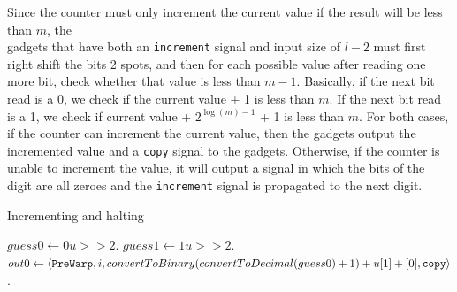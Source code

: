 \begin{itemize}
    Since the counter must only increment the current value if the result will be less than $m$,
    the \\{\cread} gadgets that have both an {\tt increment} signal and input size of $l - 2$ must
    first right shift the bits 2 spots, and then for each possible value after reading one more bit,
    check whether that value is less than $m - 1$. %
    Basically, if the next bit read is a 0, we check if the current value + 1 is less than $m$.
    If the next bit read is a 1, we check if current value + $2^{\log (m) - 1}$ + 1 is less than $m$.
    For both cases, if the counter can increment the current value, then the {\cread} gadgets output the incremented value and a {\tt copy} signal to the {\prewarp} gadgets.
    Otherwise, if the counter is unable to increment the value, it will output a signal in which the bits of the digit are all zeroes and the {\tt increment} signal is propagated to the next digit.
    \begin{algorithm}[H]
        \caption{Incrementing and halting\label{asda}}
        \begin{algorithmic}[1]
                \State $guess0 \gets 0u >> 2$.
                \State $guess1 \gets 1u >> 2$.
                    \State $out0 \gets \left\langle {\tt PreWarp}, i, convertToBinary(convertToDecimal(guess0) + 1) + u[1] + [0], {\tt copy} \right\rangle$.

\end{algorithmic}
\end{algorithm}
\end{itemize}

